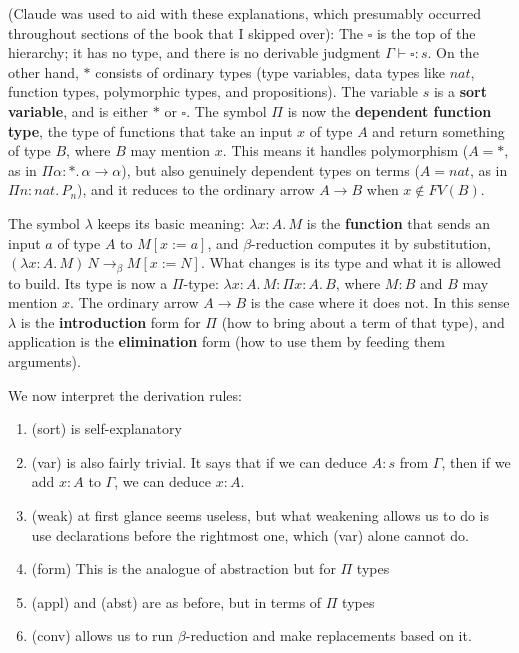 \documentclass{article}
\theoremstyle{definition}
\newcommand{\1}{\mathbb{1}}
\newcommand{\0}{\mathbb{0}}
\begin{document}
(Claude was used to aid with these explanations, which presumably occurred throughout sections of the book that I skipped over): The $\square$ is the top of the hierarchy; it has no type, and there is no derivable judgment $\Gamma \vdash \square : s$. On the other hand, $*$ consists of ordinary types (type variables, data types like $nat$, function types, polymorphic types, and propositions). The variable $s$ is a \textbf{sort variable}, and is either $*$ or $\square$. The symbol $\Pi$ is now the \textbf{dependent function type}, the type of functions that take an input $x$ of type $A$ and return something of type $B$, where $B$ may mention $x$. This means it handles polymorphism ($A = *$, as in $\Pi\alpha{:}*.\,\alpha\to\alpha$), but also genuinely dependent types on terms ($A = \textit{nat}$, as in $\Pi n{:}\textit{nat}.\,P_n$), and it reduces to the ordinary arrow $A \to B$ when $x \notin FV(B)$. 

The symbol $\lambda$ keeps its basic meaning: $\lambda x{:}A.\,M$ is the \textbf{function} that sends an input $a$ of type $A$ to $M[x:=a]$, and $\beta$-reduction computes it by substitution, $(\lambda x{:}A.\,M)\,N \to_\beta M[x:=N]$. What changes is its type and what it is allowed to build. Its type is now a $\Pi$-type: $\lambda x{:}A.\,M : \Pi x{:}A.\,B$, where $M : B$ and $B$ may mention $x$. The ordinary arrow $A \to B$ is the case where it does not. In this sense $\lambda$ is the \textbf{introduction} form for $\Pi$ (how to bring about a term of that type), and application is the \textbf{elimination} form (how to use them by feeding them arguments).

We now interpret the derivation rules:
\begin{enumerate}
    \item (sort) is self-explanatory
    \item (var) is also fairly trivial. It says that if we can deduce $A : s$ from $\Gamma$, then if we add $x : A$ to $\Gamma$, we can deduce $x : A$.
    \item (weak) at first glance seems useless, but what weakening allows us to do is use declarations before the rightmost one, which (var) alone cannot do. 
    \item (form) This is the analogue of abstraction but for $\Pi$ types
    \item (appl) and (abst) are as before, but in terms of $\Pi$ types
    \item (conv) allows us to run $\beta$-reduction and make replacements based on it. 
\end{enumerate}
\end{document}
